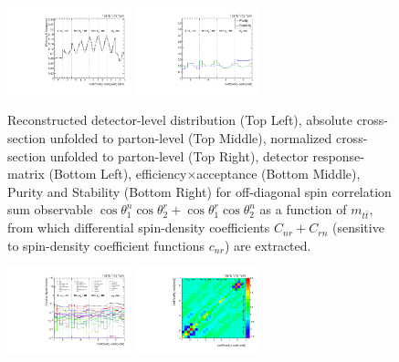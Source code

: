 \begin{refsection}
\begin{figure}[htb]
\begin{center}
 \includegraphics[width=0.32\textwidth]{fig_fullRun2UL/unfolding/combined/TotEff_c_Pnr_mttbar.pdf}
 \includegraphics[width=0.32\textwidth]{fig_fullRun2UL/unfolding/combined/PurStab_c_Pnr_mttbar.pdf} \\
\caption{Reconstructed detector-level distribution (Top Left), absolute cross-section unfolded to parton-level (Top Middle), normalized cross-section unfolded to parton-level (Top Right), detector response-matrix (Bottom Left), efficiency$\times$acceptance (Bottom Middle), Purity and Stability (Bottom Right) for off-diagonal spin correlation sum observable $\cos\theta_{1}^{n}\cos\theta_{2}^{r}+\cos\theta_{1}^{r}\cos\theta_{2}^{n}$ as a function of $m_{t\bar{t}}$, from which differential spin-density coefficients $C_{nr}+C_{rn}$ (sensitive to spin-density coefficient functions $c_{n r}$) are extracted.}
\label{fig:c_Pnr_mttbar}
\end{center}
\end{figure}
\clearpage
\begin{figure}[htb]
\begin{center}
 \includegraphics[width=0.32\textwidth]{fig_fullRun2UL/unfolding/combined/deltaSystCombinedlog_rebinnedB_c_Pnr_mttbar.pdf}
 \includegraphics[width=0.32\textwidth]{fig_fullRun2UL/unfolding/combined/StatCovMatrix_rebinnedB_c_Pnr_mttbar.pdf}

\end{center}
\end{figure}
\end{refsection}
